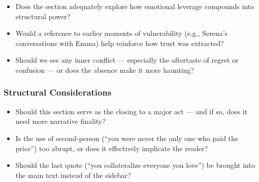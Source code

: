 \begin{itemize}
  \item Does the section adequately explore how emotional leverage compounds into structural power?
  \item Would a reference to earlier moments of vulnerability (e.g., Serena’s conversations with Emma) help reinforce how trust was extracted?
  \item Should we see any inner conflict — especially the aftertaste of regret or confusion — or does the absence make it more haunting?
\end{itemize}

\subsubsection*{Structural Considerations}

\begin{itemize}
  \item Should this section serve as the closing to a major act — and if so, does it need more narrative finality?
  \item Is the use of second-person (“you were never the only one who paid the price”) too abrupt, or does it effectively implicate the reader?
  \item Should the last quote (``you collateralize everyone you love'') be brought into the main text instead of the sidebar?
\end{itemize}

